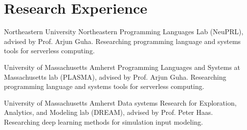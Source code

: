 \section{Research Experience}

%
{Northeastern University}%
{}%
{}%
{Northeastern Programming Languages Lab (NeuPRL), advised by Prof. Arjun Guha.
Researching programming language and systems tools for serverless computing.
%
\newline{}
}

%
{University of Massachusetts Amherst}%
{}%
{}%
{Programming Languages and Systems at Massachusetts lab (PLASMA), advised by Prof.
Arjun Guha. Researching programming language and systems tools for serverless
computing.
%
\newline{}
}

%
{University of Massachusetts Amherst}%
{}%
{}%
{Data systems Research for Exploration, Analytics, and Modeling lab (DREAM),
advised by Prof. Peter Haas. Researching deep learning methods for simulation input
modeling.
%
}